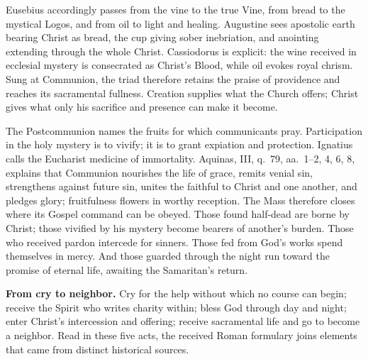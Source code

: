 Eusebius accordingly passes from the vine to the true Vine, from bread to the
mystical Logos, and from oil to light and healing. Augustine sees apostolic
earth bearing Christ as bread, the cup giving sober inebriation, and anointing
extending through the whole Christ. Cassiodorus is explicit: the wine received
in ecclesial mystery is consecrated as Christ's Blood, while oil evokes royal
chrism. Sung at Communion, the triad therefore retains the praise of providence
and reaches its sacramental fullness. Creation supplies what the Church offers;
Christ gives what only his sacrifice and presence can make it become.

The Postcommunion names the fruits for which communicants pray. Participation
in the holy mystery is to vivify; it is to grant expiation and protection.
Ignatius calls the Eucharist medicine of immortality. Aquinas,  III,
q.~79, aa.~1--2, 4, 6, 8, explains that Communion nourishes the life of grace,
remits venial sin, strengthens against future sin, unites the faithful to
Christ and one another, and pledges glory; fruitfulness flowers in worthy
reception. The Mass therefore closes where its Gospel command can be obeyed.
Those found half-dead are borne by Christ; those
vivified by his mystery become bearers of another's burden. Those who received
pardon intercede for sinners. Those fed from God's works spend themselves in
mercy. And those guarded through the night run toward the promise of eternal
life, awaiting the Samaritan's return.

\begin{studyframe}
\textbf{From cry to neighbor.} Cry for the help without which no course can
begin; receive the Spirit who writes charity within; bless God through day and
night; enter Christ's intercession and offering; receive sacramental life and
go to become a neighbor. Read in these five acts, the received Roman
formulary joins elements that came from distinct historical sources.
\end{studyframe}

\label{triptych:brief-synthesis:end}
\endgroup
\clearpage
